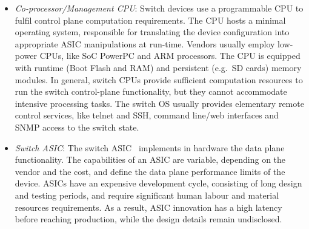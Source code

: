 \begin{itemize}
  \item \emph{Co-processor/Management CPU}: Switch devices use a programmable
      CPU to fulfil control plane computation requirements. The CPU hosts a
      minimal operating system, responsible for translating the device
      configuration into appropriate ASIC manipulations at run-time. Vendors
      usually employ low-power CPUs, like SoC PowerPC and ARM processors. The
      CPU is equipped with runtime (Boot Flash and RAM) and persistent (e.g.~SD
      cards) memory modules. In general, switch CPUs provide sufficient
      computation resources to run the switch control-plane functionality, but
      they cannot accommodate intensive processing tasks. The switch OS usually
      provides elementary remote control services, like telnet and SSH, command
      line/web interfaces and SNMP access to the switch state. 
 
  \item \emph{Switch ASIC}: The switch
      ASIC~ implements in hardware the
      data plane functionality. The capabilities of an ASIC are variable,
      depending on the vendor and the cost, and define the data plane
      performance limits of the device.  ASICs have an expensive development
      cycle, consisting of long design and testing periods, and require
      significant human labour and material resources requirements. As a result,
      ASIC innovation has a high latency before reaching production, while the design
      details remain undisclosed.  


\end{itemize}
